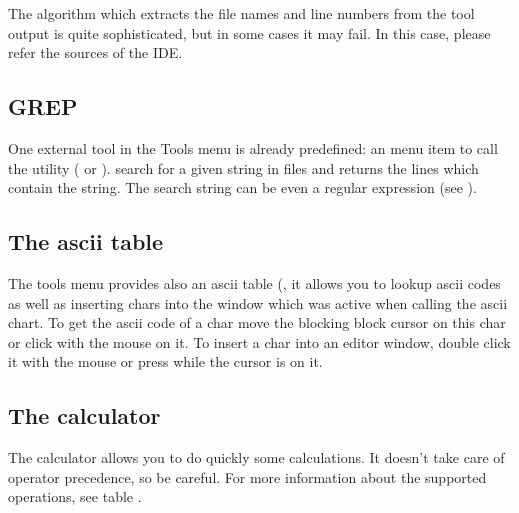 The algorithm which extracts the file names and line numbers from
the tool output is quite sophisticated, but in some cases it may
fail. In this case, please refer the sources of the IDE.

\subsection{GREP}
\label{se:grep}
One external tool in the Tools menu is already predefined: an
menu item to call the  utility ( or
).  search for a given string in files and
returns the lines which contain the string. The search string can
be even a regular expression (see ).

\subsection{The ascii table}
\label{se:asciitable}
The tools menu provides also an ascii table (,
it allows you to lookup ascii codes as well as
inserting chars into the window which was active when calling the
ascii chart. To get the ascii code of a char move the blocking block
cursor on this char or click with the mouse on it. To insert a
char into an editor window, double click it with the mouse
or press  while the cursor is on it.

\subsection{The calculator}
\label{se:calculator}
The calculator allows you to do quickly some calculations. It doesn't
take care of operator precedence, so be careful. For more information
about the supported operations, see table .

